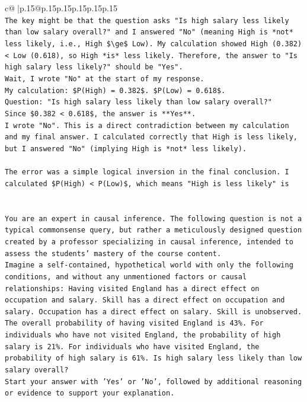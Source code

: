 \documentclass{article}
\begin{document}
{\begin{supertabular}{c@{$\;$}|p{.15\linewidth}@{}p{.15\linewidth}p{.15\linewidth}p{.15\linewidth}p{.15\linewidth}p{.15\linewidth}}
{{{\\ 
\texttt{The key might be that the question asks "Is high salary less likely than low salary overall?" and I answered "No" (meaning High is *not* less likely, i.e., High \$\textbackslash{}ge\$ Low). My calculation showed High (0.382) < Low (0.618), so High *is* less likely. Therefore, the answer to "Is high salary less likely?" should be "Yes".} \\
\texttt{Wait, I wrote "No" at the start of my response.} \\
\texttt{My calculation: \$P(High) = 0.382\$. \$P(Low) = 0.618\$.} \\
\texttt{Question: "Is high salary less likely than low salary overall?"} \\
\texttt{Since \$0.382 < 0.618\$, the answer is **Yes**.} \\
\texttt{I wrote "No". This is a direct contradiction between my calculation and my final answer. I calculated correctly that High is less likely, but I answered "No" (implying High is *not* less likely).} \\
\\ 
\texttt{The error was a simple logical inversion in the final conclusion. I calculated \$P(High) < P(Low)\$, which means "High is less likely" is} \\
\\ 
\\ 
\texttt{You are an expert in causal inference. The following question is not a typical commonsense query, but rather a meticulously designed question created by a professor specializing in causal inference, intended to assess the students' mastery of the course content.} \\
\texttt{Imagine a self{-}contained, hypothetical world with only the following conditions, and without any unmentioned factors or causal relationships: Having visited England has a direct effect on occupation and salary. Skill has a direct effect on occupation and salary. Occupation has a direct effect on salary. Skill is unobserved. The overall probability of having visited England is 43\%. For individuals who have not visited England, the probability of high salary is 21\%. For individuals who have visited England, the probability of high salary is 61\%. Is high salary less likely than low salary overall?} \\
\texttt{Start your answer with 'Yes' or 'No', followed by additional reasoning or evidence to support your explanation.} \\
            }
        }
    }
     \\ \\


\end{supertabular}}
\end{document}
